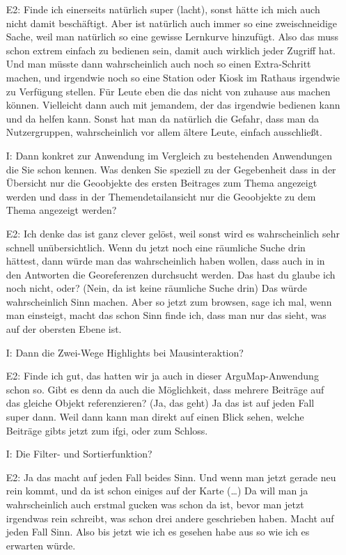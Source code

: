 \begin{itemize}
    \item[E2:] Finde ich einerseits nat{\"u}rlich super (lacht), sonst h{\"a}tte ich mich auch nicht damit besch{\"a}ftigt. Aber ist nat{\"u}rlich auch immer so eine zweischneidige Sache, weil man nat{\"u}rlich so eine gewisse Lernkurve hinzuf{\"u}gt. Also das muss schon extrem einfach zu bedienen sein, damit auch wirklich jeder Zugriff hat. Und man m{\"u}sste dann wahrscheinlich auch noch so einen Extra-Schritt machen, und irgendwie noch so eine Station oder Kiosk im Rathaus irgendwie zu Verf{\"u}gung stellen. F{\"u}r Leute eben die das nicht von zuhause aus machen k{\"o}nnen. Vielleicht dann auch mit jemandem, der das irgendwie bedienen kann und da helfen kann. Sonst hat man da nat{\"u}rlich die Gefahr, dass man da Nutzergruppen, wahrscheinlich vor allem {\"a}ltere Leute, einfach ausschlie{\ss}t.
    \item[I:] Dann konkret zur Anwendung im Vergleich zu bestehenden Anwendungen die Sie schon kennen. Was denken Sie speziell zu der Gegebenheit dass in der {\"U}bersicht nur die Geoobjekte des ersten Beitrages zum Thema angezeigt werden und dass in der Themendetailansicht nur die Geoobjekte zu dem Thema angezeigt werden?
    \item[E2:] Ich denke das ist ganz clever gel{\"o}st, weil sonst wird es wahrscheinlich sehr schnell un{\"u}bersichtlich. Wenn du jetzt noch eine r{\"a}umliche Suche drin h{\"a}ttest, dann w{\"u}rde man das wahrscheinlich haben wollen, dass auch in in den Antworten die Georeferenzen durchsucht werden. Das hast du glaube ich noch nicht, oder? (Nein, da ist keine r{\"a}umliche Suche drin) Das w{\"u}rde wahrscheinlich Sinn machen. Aber so jetzt zum browsen, sage ich mal, wenn man einsteigt, macht das schon Sinn finde ich, dass man nur das sieht, was auf der obersten Ebene ist.
    \item[I:] Dann die Zwei-Wege Highlights bei Mausinteraktion?
    \item[E2:] Finde ich gut, das hatten wir ja auch in dieser ArguMap-Anwendung schon so. Gibt es denn da auch die M{\"o}glichkeit, dass mehrere Beitr{\"a}ge auf das gleiche Objekt referenzieren? (Ja, das geht) Ja das ist auf jeden Fall super dann. Weil dann kann man direkt auf einen Blick sehen, welche Beitr{\"a}ge gibts jetzt zum ifgi, oder zum Schloss.
    \item[I:] Die Filter- und Sortierfunktion?
    \item[E2:] Ja das macht auf jeden Fall beides Sinn. Und wenn man jetzt gerade neu rein kommt, und da ist schon einiges auf der Karte (\dots) Da will man ja wahrscheinlich auch erstmal gucken was schon da ist, bevor man jetzt irgendwas rein schreibt, was schon drei andere geschrieben haben. Macht auf jeden Fall Sinn. Also bis jetzt wie ich es gesehen habe aus so wie ich es erwarten w{\"u}rde.

\end{itemize}
